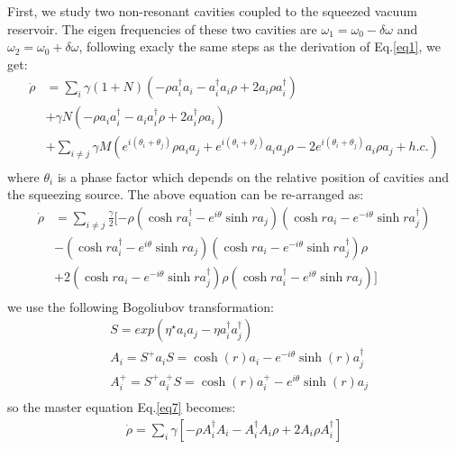 \documentclass{article}
\begin{document}
First, we study two non-resonant cavities coupled to the squeezed vacuum reservoir. The eigen frequencies of these two cavities are $\omega_1=\omega_0-\delta \omega$ and $\omega_2=\omega_0+\delta \omega$, following exacly the same steps as the derivation of Eq.\eqref{eq1}, we get:
\begin{equation}
\label{eq6}
\begin{split}
\dot{\rho}&=\sum_{i}\gamma(1+N)(-\rho a_{i}^{\dagger}a_{i}-a_{i}^{\dagger}a_{i}\rho+2a_{i}\rho a_{i}^{\dagger})\\
&+\gamma N(-\rho a_{i}a_{i}^{\dagger}-a_{i}a_{i}^{\dagger}\rho+2a_{i}^{\dagger}\rho a_{i})\\
&+\sum_{i\ne j}\gamma M(e^{i(\theta_i+\theta_j)}\rho a_{i}a_{j}+e^{i(\theta_i+\theta_j)}a_{i}a_{j}\rho-2e^{i(\theta_i+\theta_j)}a_{i}\rho a_{j}+h.c.)\\
\end{split}
\end{equation}
where $\theta_i$ is a phase factor which depends on the relative position of cavities and the squeezing source. The above equation can be re-arranged as:
\begin{equation}
\label{eq7}
\begin{split}
\dot{\rho}&=\sum_{i\ne j}\frac{\gamma}{2}[-\rho(\cosh ra_{i}^{\dagger}-e^{i\theta}\sinh ra_{j})(\cosh ra_{i}-e^{-i\theta}\sinh ra_{j}^{\dagger})\\
&-(\cosh ra_{i}^{\dagger}-e^{i\theta}\sinh ra_{j})(\cosh ra_{i}-e^{-i\theta}\sinh ra_{j}^{\dagger})\rho\\
&+2(\cosh ra_{i}-e^{-i\theta}\sinh ra_{j}^{\dagger})\rho(\cosh ra_{i}^{\dagger}-e^{i\theta}\sinh ra_{j})]\\
\end{split}
\end{equation}
we use the following Bogoliubov transformation\cite{Bogoliubov}:
\begin{equation}
\label{eq8}
\begin{split}
&S=exp(\eta^{\star}a_{i}a_{j}-\eta a_{i}^{\dagger}a_{j}^{\dagger})\\
&A_{i}=S^{+}a_{i}S=\cosh(r)a_{i}-e^{-i\theta}\sinh(r)a_{j}^{\dagger} \\
&A_{i}^{+}=S^{+}a_{i}^{+}S=\cosh(r)a_{i}^{+}-e^{i\theta}\sinh(r)a_{j}\\
\end{split}
\end{equation}
so the master equation Eq.\eqref{eq7} becomes:
\begin{equation}
\label{eq9}
\begin{split}
\dot{\rho}=\sum_{i}\gamma[-\rho A_{i}^{\dagger}A_{i}-A_{i}^{\dagger}A_{i}\rho+2A_{i}\rho A_{i}^{\dagger}]
\end{split}
\end{equation}
\end{document}
